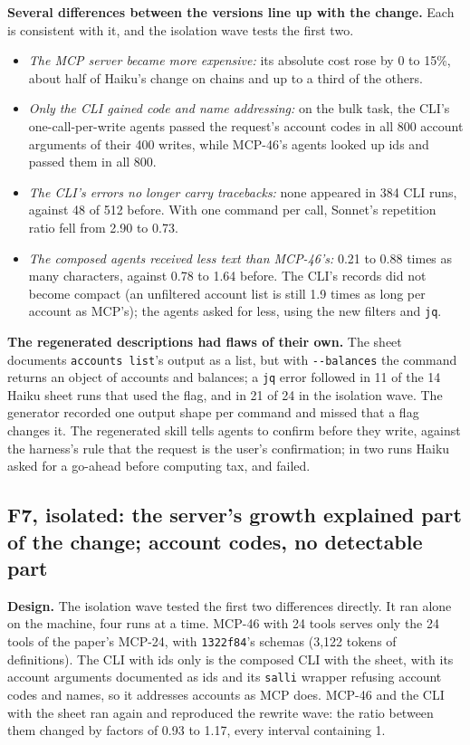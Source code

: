 \documentclass[sigconf,nonacm]{acmart}
\newcommand{\flag}[1]{\texttt{-\/-#1}}
\newcommand{\cmd}[1]{\texttt{#1}}
\newcommand{\cfg}[1]{\textsf{#1}}
\newcommand{\finding}[1]{\textbf{#1}}
\begin{document}
\finding{Several differences between the versions line up with the change.} Each is consistent with it, and the isolation wave tests the first two.
\begin{itemize}
\item \emph{The MCP server became more expensive:} its absolute cost rose by 0 to 15\%, about half of Haiku's change on chains and up to a third of the others.
\item \emph{Only the CLI gained code and name addressing:} on the bulk task, the CLI's one-call-per-write agents passed the request's account codes in all 800 account arguments of their 400 writes, while \cfg{MCP-46}'s agents looked up ids and passed them in all 800.
\item \emph{The CLI's errors no longer carry tracebacks:} none appeared in 384 CLI runs, against 48 of 512 before. With one command per call, Sonnet's repetition ratio fell from 2.90 to 0.73.
\item \emph{The composed agents received less text than \cfg{MCP-46}'s:} 0.21 to 0.88 times as many characters, against 0.78 to 1.64 before. The CLI's records did not become compact (an unfiltered account list is still 1.9 times as long per account as MCP's); the agents asked for less, using the new filters and \texttt{jq}.
\end{itemize}

\finding{The regenerated descriptions had flaws of their own.} The sheet documents \cmd{accounts list}'s output as a list, but with \flag{balances} the command returns an object of accounts and balances; a \texttt{jq} error followed in 11 of the 14 Haiku sheet runs that used the flag, and in 21 of 24 in the isolation wave. The generator recorded one output shape per command and missed that a flag changes it. The regenerated skill tells agents to confirm before they write, against the harness's rule that the request is the user's confirmation; in two runs Haiku asked for a go-ahead before computing tax, and failed.

\subsection{F7, isolated: the server's growth explained part of the change; account codes, no detectable part}
\label{sec:isolation}
\finding{Design.} The isolation wave tested the first two differences directly. It ran alone on the machine, four runs at a time. \cfg{MCP-46} with 24 tools serves only the 24 tools of the paper's \cfg{MCP-24}, with \texttt{1322f84}'s schemas (3{,}122 tokens of definitions). The CLI with ids only is the composed CLI with the sheet, with its account arguments documented as ids and its \cmd{salli} wrapper refusing account codes and names, so it addresses accounts as MCP does. \cfg{MCP-46} and the CLI with the sheet ran again and reproduced the rewrite wave: the ratio between them changed by factors of 0.93 to 1.17, every interval containing 1.
\end{document}
